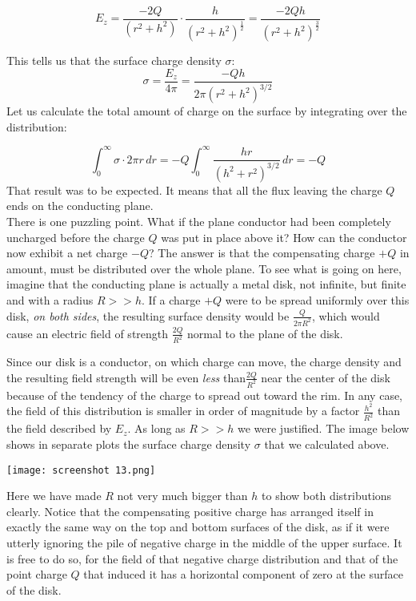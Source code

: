 \documentclass[svgnames]{article}
\begin{document}
\[ E_z = \frac{-2Q}{(r^2+h^2)} \cdot \frac{h}{(r^2 + h^2)^{\frac{1}{2}}}
= \frac{-2Qh}{(r^2 + h^2)^\frac{3}{2}} \]

This tells us that the surface charge density $\sigma$: 
\[
  \sigma = \frac{E_z}{4\pi} = \frac{-Qh}{2\pi(r^2 + h^2)^{3/2}}
\] 
Let us calculate the total amount of charge on the surface by integrating over
the distribution: 

\[
\int_{0}^{\infty} \sigma \cdot 2\pi r \, dr = -Q \int_{0}^{\infty}
\frac{hr}{(h^2 + r^2)^{3/2}} \, dr = -Q  
\] 
That result was to be expected. It means that all the flux leaving the charge
$Q$ ends on the conducting plane. \\
There is one puzzling point. What if the plane conductor had been completely
uncharged before the charge $Q$ was put in place above it? How can the
conductor now exhibit a net charge $-Q$? The answer is that the compensating
charge $+Q$ in amount, must be distributed over the whole plane. To see what is
going on here, imagine that the conducting plane is actually a metal disk, not
infinite, but finite and with a radius $R >> h$. If a charge $+Q$ were to be
spread uniformly over this disk, \textit{on both sides}, the resulting surface
density would be $\frac{Q}{2\pi R^2}$, which would cause an electric field of
strength $\frac{2Q}{R^2}$ normal to the plane of the disk. 


Since our disk is a conductor, on which charge can move, the charge density and
the resulting field strength will be even \textit{less} than$ \frac{2Q}{R^2}$
near the center of the disk because of the tendency of the charge to spread out
toward the rim. In any case, the field of this distribution is smaller in order
of magnitude by a factor $\frac{h^2}{R^2}$ than the field described by $E_z$.
As long as $R>>h$ we were justified. The image below shows in separate plots
the surface charge density $\sigma$ that we calculated above. 

\begin{center}
\texttt{[image: screenshot 13.png]}
\end{center}

Here we have made $R$ not very much bigger than $h$ to show both distributions
clearly. Notice that the compensating positive charge has arranged itself in
exactly the same way on the top and bottom surfaces of the disk, as if it were
utterly ignoring the pile of negative charge in the middle of the upper
surface. It is free to do so, for the field of that negative charge
distribution and that of the point charge $Q$ that induced it has a horizontal
component of zero at the surface of the disk. \\
\end{document}
